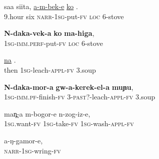 \documentclass[output=paper]{LSP/langsci}
\begin{document}
 \begin{exe}
 \label{Saapp13}
\gll saa siita,  \underline{a-m-bek-e} \underline{ko} \underline{}.\\
\textsc{9}.hour  six  \textsc{narr}-\textsc{1sg}-put-\textsc{fv}  \textsc{loc} \textsc{6}-stove\\
\glt {}
\end{exe}

 \begin{exe}
 \label{Saapp14}
\gll \textbf{N-daka-vek-a} \textbf{ko} \textbf{ma-higa},\\
\textsc{1sg-imm}.\textsc{perf}-put-\textsc{fv}  \textsc{loc}  \textsc{6}-stove\\
\glt {}
\end{exe}

 \begin{exe}
 \label{Saapp15}
\gll \underline{na} \underline{} \underline{}.\\
then  \textsc{1sg}-leach-\textsc{appl}-\textsc{fv} \textsc{3}.soup\\
\glt {}
\end{exe}

 \begin{exe}
 \label{Saapp16}
\gll \textbf{N-daka-mor-a} \textbf{gw-a-kerek-el-a} \textbf{muɲu},\\
\textsc{1sg}-\textsc{imm.pf}-finish-\textsc{fv} \textsc{3}-\textsc{past}?-leach-\textsc{appl}-\textsc{fv}  \textsc{3}.soup  \\
\glt {}
\end{exe}

 \begin{exe}
 \label{Saapp17}
\gll man̪-a m-bogor-e n-zog-iz-e,\\
\textsc{1sg}.want-\textsc{fv}  \textsc{1sg}-take-\textsc{fv}  \textsc{1sg}-wash-\textsc{appl}-\textsc{fv}\\
\glt {}
\end{exe}

 \begin{exe}
 \label{Saapp18}
\gll a-ŋ-gamor-e,\\
\textsc{narr}-\textsc{1sg}-wring-\textsc{fv}\\
\glt {}
\end{exe}
\end{document}
